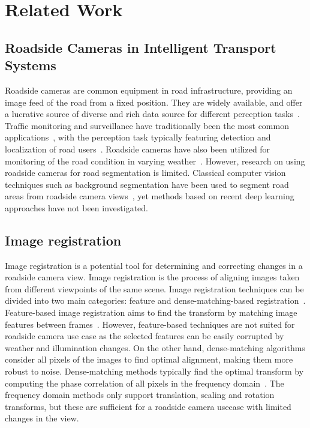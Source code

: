 \section{Related Work}
\subsection{Roadside Cameras in Intelligent Transport Systems}

Roadside cameras are common equipment in road infrastructure, providing an image feed of the road from a fixed position. They are widely available, and offer a lucrative source of diverse and rich data source for different perception tasks~\cite{ye2022rope3d, cress2024tumtraf}. Traffic monitoring and surveillance have traditionally been the most common applications~\cite{wu2006traffic, douxchamps2006high, dubska2014fully, schoepflin2003dynamic}, with the perception task typically featuring detection and localization of road users~\cite{zou2022real, zhang2024evaluating}. Roadside cameras have also been utilized for monitoring of the road condition in varying weather~\cite{ojala2024road, carrillo2020integration}. However, research on using roadside cameras for road segmentation is limited. Classical computer vision techniques such as background segmentation have been used to segment road areas from roadside camera views~\cite{fang2015automatic}, yet methods based on recent deep learning approaches have not been investigated.


\subsection{Image registration}

Image registration is a potential tool for determining and correcting changes in a roadside camera view. Image registration is the process of aligning images taken from different viewpoints of the same scene. Image registration techniques can be divided into two main categories: feature and dense-matching-based registration~\cite{marcenaro2001image}. Feature-based image registration aims to find the transform by matching image features between frames~\cite{markel1972sift}. However, feature-based techniques are not suited for roadside camera use case as the selected features can be easily corrupted by weather and illumination changes. On the other hand, dense-matching algorithms consider all pixels of the images to find optimal alignment, making them more robust to noise.  Dense-matching methods typically find the optimal transform by computing the phase correlation of all pixels in the frequency domain~\cite{tong2019image}. The frequency domain methods only support translation, scaling and rotation transforms, but these are sufficient for a roadside camera usecase with limited changes in the view. 

